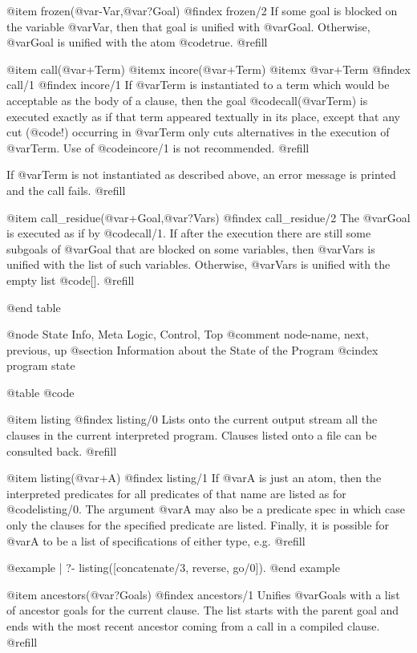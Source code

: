 @item frozen(@var{-Var},@var{?Goal})
@findex frozen/2
If some goal is blocked on the variable @var{Var}, then that goal is
unified with @var{Goal}.  Otherwise, @var{Goal} is unified with the atom
@code{true}. @refill

@item call(@var{+Term})
@itemx incore(@var{+Term})
@itemx @var{+Term}
@findex call/1
@findex incore/1
If @var{Term} is instantiated to a term which would be acceptable as the
body of a clause, then the goal @code{call(@var{Term})} is executed exactly
as if that term appeared textually in its place, except that any cut
(@code{!}) occurring in @var{Term} only cuts alternatives in the execution
of @var{Term}.  Use of @code{incore/1} is not recommended. @refill

If @var{Term} is not instantiated as described above, an  error  message  is
printed and the call fails. @refill

@item call_residue(@var{+Goal},@var{?Vars})
@findex call_residue/2
The @var{Goal} is executed as if by @code{call/1}.  If after the
execution there are still some subgoals of @var{Goal} that are blocked
on some variables, then @var{Vars} is unified with the list of such
variables.  Otherwise, @var{Vars} is unified with the empty list
@code{[]}. @refill

@end table

@node State Info, Meta Logic, Control, Top
@comment  node-name,  next,  previous,  up
@section Information about the State of the Program
@cindex program state

@table @code

@item listing
@findex listing/0
Lists onto the current output stream all the clauses in the current
interpreted program.  Clauses listed onto a file can be consulted back.
@refill

@item listing(@var{+A})
@findex listing/1
If @var{A} is just an atom, then the interpreted predicates for all
predicates of that name are listed as for @code{listing/0}.  The
argument @var{A} may also be a predicate spec in which case only the
clauses for the specified predicate are listed.  Finally, it is possible
for @var{A} to be a list of specifications of either type, e.g. @refill

@example
| ?- listing([concatenate/3, reverse, go/0]).
@end example

@item ancestors(@var{?Goals})
@findex ancestors/1
Unifies @var{Goals} with a list of ancestor goals for the current clause.
The list starts with the parent goal and ends with the most recent ancestor
coming from a call in a compiled clause.  @refill

